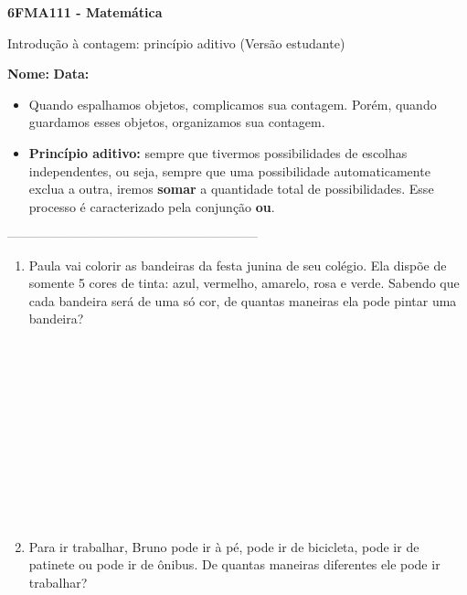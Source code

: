 \documentclass[a4paper,14pt]{article}
\begin{document}
	
	\noindent\textbf{6FMA111 - Matemática} 
	
	\begin{center}Introdução à contagem: princípio aditivo (Versão estudante)
	\end{center}
	
	\noindent\textbf{Nome:} \underline{\hspace{10cm}}
	\noindent\textbf{Data:} \underline{\hspace{4cm}}
	
	
	\begin{multicols}{2}
		\noindent \begin{itemize} 
		\item Quando espalhamos objetos, complicamos sua contagem. Porém, quando guardamos esses objetos, organizamos sua contagem.
		\item \textbf{Princípio aditivo:} sempre que tivermos possibilidades de escolhas independentes, ou seja, sempre que uma possibilidade automaticamente exclua a outra, iremos \textbf{somar} a quantidade total de possibilidades. Esse processo é caracterizado pela conjunção \textbf{ou}.
		\end{itemize}
		\noindent\textsubscript{-----------------------------------------------------------------------}
		\begin{enumerate} 
			\item Paula vai colorir as bandeiras da festa junina de seu colégio. Ela dispõe de somente 5 cores de tinta: azul, vermelho, amarelo, rosa e verde. Sabendo que cada bandeira será de uma só cor, de quantas maneiras ela pode pintar uma bandeira? \\\\\\\\\\\\\\\\\\\\\\\\
			\item Para ir trabalhar, Bruno pode ir à pé, pode ir de bicicleta, pode ir de patinete ou pode ir de ônibus. De quantas maneiras diferentes ele pode ir trabalhar? \\\\\\\\\\\\\\\\\\\\\\\\

\end{enumerate}
\end{multicols}
\end{document}
